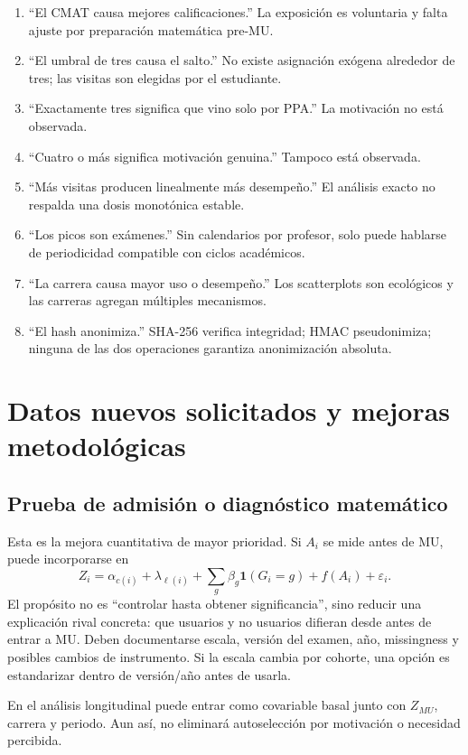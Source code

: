 \documentclass[11pt,letterpaper]{article}
\begin{document}
\begin{enumerate}[leftmargin=*]
\item ``El CMAT causa mejores calificaciones.'' La exposición es voluntaria y falta ajuste por preparación matemática pre-MU.
\item ``El umbral de tres causa el salto.'' No existe asignación exógena alrededor de tres; las visitas son elegidas por el estudiante.
\item ``Exactamente tres significa que vino solo por PPA.'' La motivación no está observada.
\item ``Cuatro o más significa motivación genuina.'' Tampoco está observada.
\item ``Más visitas producen linealmente más desempeño.'' El análisis exacto no respalda una dosis monotónica estable.
\item ``Los picos son exámenes.'' Sin calendarios por profesor, solo puede hablarse de periodicidad compatible con ciclos académicos.
\item ``La carrera causa mayor uso o desempeño.'' Los scatterplots son ecológicos y las carreras agregan múltiples mecanismos.
\item ``El hash anonimiza.'' SHA-256 verifica integridad; HMAC pseudonimiza; ninguna de las dos operaciones garantiza anonimización absoluta.
\end{enumerate}

\section{Datos nuevos solicitados y mejoras metodológicas}

\subsection{Prueba de admisión o diagnóstico matemático}

Esta es la mejora cuantitativa de mayor prioridad. Si $A_i$ se mide antes de MU, puede incorporarse en
\[
Z_i=\alpha_{c(i)}+\lambda_{\ell(i)}+\sum_g\beta_g\mathbf1(G_i=g)+f(A_i)+\varepsilon_i.
\]
El propósito no es ``controlar hasta obtener significancia'', sino reducir una explicación rival concreta: que usuarios y no usuarios difieran desde antes de entrar a MU. Deben documentarse escala, versión del examen, año, missingness y posibles cambios de instrumento. Si la escala cambia por cohorte, una opción es estandarizar dentro de versión/año antes de usarla.

En el análisis longitudinal puede entrar como covariable basal junto con $Z_{MU}$, carrera y periodo. Aun así, no eliminará autoselección por motivación o necesidad percibida.
\end{document}
